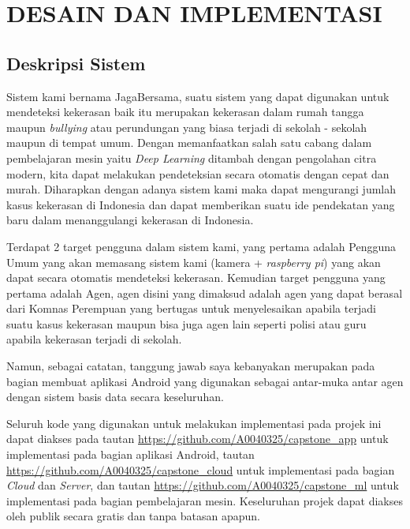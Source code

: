 \chapter{DESAIN DAN IMPLEMENTASI}


\section{Deskripsi Sistem}

Sistem kami bernama JagaBersama, suatu sistem yang dapat digunakan untuk mendeteksi kekerasan baik itu merupakan kekerasan dalam rumah tangga maupun \textit{bullying} atau perundungan yang biasa terjadi di sekolah - sekolah maupun di tempat umum. Dengan memanfaatkan salah satu cabang dalam pembelajaran mesin yaitu \textit{Deep Learning} ditambah dengan pengolahan citra modern, kita dapat melakukan pendeteksian secara otomatis dengan cepat dan murah. Diharapkan dengan adanya sistem kami maka dapat mengurangi jumlah kasus kekerasan di Indonesia dan dapat memberikan suatu ide pendekatan yang baru dalam menanggulangi kekerasan di Indonesia.

Terdapat 2 target pengguna dalam sistem kami, yang pertama adalah Pengguna Umum yang akan memasang sistem kami (kamera + \textit{raspberry pi}) yang akan dapat secara otomatis mendeteksi kekerasan. Kemudian target pengguna yang pertama adalah Agen, agen disini yang dimaksud adalah agen yang dapat berasal dari Komnas Perempuan yang bertugas untuk menyelesaikan apabila terjadi suatu kasus kekerasan maupun bisa juga agen lain seperti polisi atau guru apabila kekerasan terjadi di sekolah.

Namun, sebagai catatan, tanggung jawab saya kebanyakan merupakan pada bagian membuat aplikasi Android yang digunakan sebagai antar-muka antar agen dengan sistem basis data secara keseluruhan.

Seluruh kode yang digunakan untuk melakukan implementasi pada projek ini dapat diakses pada tautan \url{https://github.com/A0040325/capstone_app} untuk implementasi pada bagian aplikasi Android, tautan \url{https://github.com/A0040325/capstone_cloud} untuk implementasi pada bagian \textit{Cloud} dan \textit{Server}, dan tautan \url{https://github.com/A0040325/capstone_ml} untuk implementasi pada bagian pembelajaran mesin. Keseluruhan projek dapat diakses oleh publik secara gratis dan tanpa batasan apapun.

